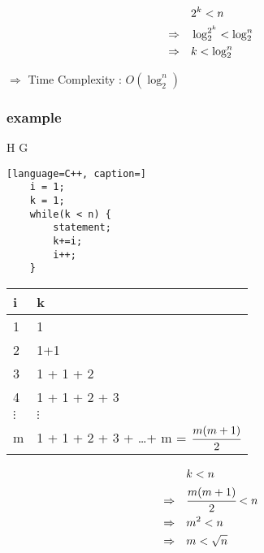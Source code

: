 \documentclass[12pt]{article}
\begin{document}
\begin{align*}
\Large
&2^{k}< n \\
\Rightarrow \quad &\log^{2^{k}}_{2} < \log^{n}_{2} \\
\Rightarrow \quad &k < \log^{n}_{2} 
\end{align*}


$\Rightarrow$ Time Complexity : $O(\log^{n}_{2})$




\subsubsection{example}






\begin{center}
  \bgroup
  \def\arraystretch{1.5}%
  \begin{tabular}{ H  G  }
	\begin{lstlisting}[language=C++, caption=]
	i = 1;
	k = 1;
	while(k < n) {
		statement;
		k+=i;
		i++;
	}
	\end{lstlisting}
  \end{tabular}
  \egroup
\end{center}





\begin{center}
  \bgroup
  \def\arraystretch{1.5}%
  \begin{tabular}{ l  l }
	i & k
     \\ \hline
     1 & 1
     \\
     2 & 1+1 
     \\
     3 & 1 + 1 + 2 
     \\
     4 & 1 + 1 + 2 + 3
     \\
     $\vdots$ & $\vdots$
     \\
     m & 1 + 1 + 2 + 3 + \dots + m = $\cfrac{m(m+1)}{2}$
     \\
  \end{tabular}
  \egroup
\end{center}


\begin{align*}
\Large
&k < n \\
\Rightarrow \quad & \cfrac{m(m+1)}{2} < n \\
\Rightarrow \quad & m^{2} < n \\
\Rightarrow \quad & m < \sqrt{n} \\
\end{align*}
\end{document}
